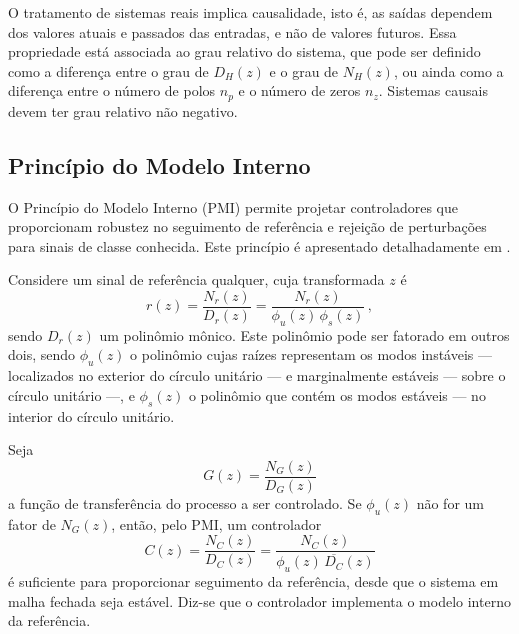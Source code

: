 \documentclass[repeatfields,oneside]{tcc}
\newcommand{\mycdot}{ \, }
\begin{document}
O tratamento de sistemas reais implica causalidade, isto é, as saídas dependem dos valores atuais e passados das entradas, e não de valores futuros.
Essa propriedade está associada ao grau relativo do sistema, que pode ser definido como a diferença entre o grau de $D_H(z)$ e o grau de $N_H(z)$, ou ainda como a diferença entre o número de polos $n_p$ e o número de zeros $n_z$.
Sistemas causais devem ter grau relativo não negativo.

\subsection{Princípio do Modelo Interno}\label{sec:controle_PMI}

O Princípio do Modelo Interno (PMI) permite projetar controladores que proporcionam robustez no seguimento de referência e rejeição de perturbações para sinais de classe conhecida.
Este princípio é apresentado detalhadamente em \cite{Chen1999}.

Considere um sinal de referência qualquer, cuja transformada $z$ é
\begin{equation}\label{eq:pmi_r_frac}
    r(z) = \dfrac{ N_r(z) } {D_r(z) } = \dfrac{ N_r(z) }{ \phi_u(z) \mycdot \phi_s(z) }
    \,,
\end{equation}
sendo $D_r(z)$ um polinômio mônico.
Este polinômio pode ser fatorado em outros dois, sendo $\phi_u(z)$ o polinômio cujas raízes representam os modos instáveis --- localizados no exterior do círculo unitário --- e marginalmente estáveis --- sobre o círculo unitário ---, e $\phi_s(z)$ o polinômio que contém os modos estáveis --- no interior do círculo unitário.

Seja
\begin{equation}\label{eq:pmi_G_frac}
    G(z) = \dfrac{ N_G(z) }{ D_G(z) }
\end{equation}
a função de transferência do processo a ser controlado.
Se $\phi_u(z)$ não for um fator de $N_G(z)$, então, pelo PMI, um controlador
\begin{equation}\label{eq:pmi_C_frac}
    C(z) = \dfrac{ N_C(z) }{ D_C(z) } = \dfrac{ N_C(z) }{ \phi_u(z) \mycdot \overline{D_C}(z) }
\end{equation}
é suficiente para proporcionar seguimento da referência, desde que o sistema em malha fechada seja estável.
Diz-se que o controlador implementa o modelo interno da referência.

\end{document}
